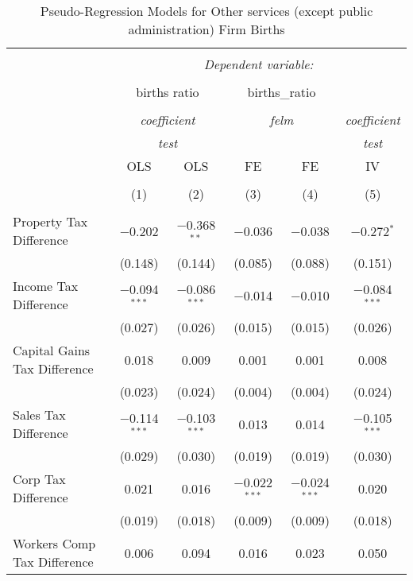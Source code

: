 
\begin{table}[!htbp] \centering 
  \caption{Pseudo-Regression Models for  Other services (except public administration) Firm Births} 
  \label{} 
\begin{tabular}{@{\extracolsep{5pt}}lccccc} 
\\[-1.8ex]\hline 
\hline \\[-1.8ex] 
 & \multicolumn{5}{c}{\textit{Dependent variable:}} \\ 
\cline{2-6} 
\\[-1.8ex] & \multicolumn{2}{c}{births ratio} & \multicolumn{2}{c}{births\_ratio} &   \\ 
\\[-1.8ex] & \multicolumn{2}{c}{\textit{coefficient}} & \multicolumn{2}{c}{\textit{felm}} & \textit{coefficient} \\ 
 & \multicolumn{2}{c}{\textit{test}} & \multicolumn{2}{c}{\textit{}} & \textit{test} \\ 
 & OLS & OLS & FE & FE & IV \\ 
\\[-1.8ex] & (1) & (2) & (3) & (4) & (5)\\ 
\hline \\[-1.8ex] 
 Property Tax Difference & $-$0.202 & $-$0.368$^{**}$ & $-$0.036 & $-$0.038 & $-$0.272$^{*}$ \\ 
  & (0.148) & (0.144) & (0.085) & (0.088) & (0.151) \\ 
  Income Tax Difference & $-$0.094$^{***}$ & $-$0.086$^{***}$ & $-$0.014 & $-$0.010 & $-$0.084$^{***}$ \\ 
  & (0.027) & (0.026) & (0.015) & (0.015) & (0.026) \\ 
  Capital Gains Tax Difference & 0.018 & 0.009 & 0.001 & 0.001 & 0.008 \\ 
  & (0.023) & (0.024) & (0.004) & (0.004) & (0.024) \\ 
  Sales Tax Difference & $-$0.114$^{***}$ & $-$0.103$^{***}$ & 0.013 & 0.014 & $-$0.105$^{***}$ \\ 
  & (0.029) & (0.030) & (0.019) & (0.019) & (0.030) \\ 
  Corp Tax Difference & 0.021 & 0.016 & $-$0.022$^{***}$ & $-$0.024$^{***}$ & 0.020 \\ 
  & (0.019) & (0.018) & (0.009) & (0.009) & (0.018) \\ 
  Workers Comp Tax Difference & 0.006 & 0.094 & 0.016 & 0.023 & 0.050 \\ 

\end{tabular}
\end{table}
